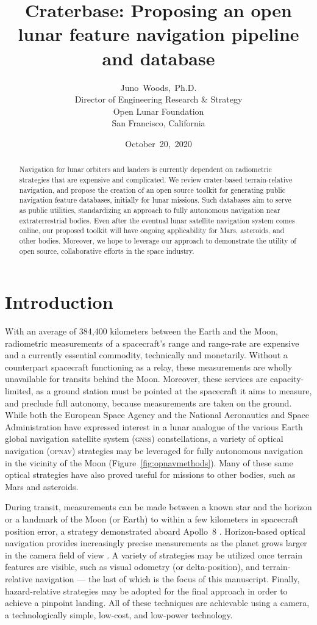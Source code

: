 \documentclass[12pt]{olfmemo}
\title{Craterbase: Proposing an open lunar feature navigation pipeline and database}
\author{
        Juno~Woods,~Ph.D. \\
        Director of Engineering Research \& Strategy\\
        Open Lunar Foundation\\
        San Francisco, California
}
\date{October~20,~2020}
\begin{document}
\maketitle

\begin{abstract}
Navigation for lunar orbiters and landers is currently dependent on radiometric strategies that are expensive and complicated. We review crater-based terrain-relative navigation, and propose the creation of an open source toolkit for generating public navigation feature databases, initially for lunar missions. Such databases aim to serve as public utilities, standardizing an approach to fully autonomous navigation near extraterrestrial bodies. Even after the eventual lunar satellite navigation system comes online, our proposed toolkit will have ongoing applicability for Mars, asteroids, and other bodies. Moreover, we hope to leverage our approach to demonstrate the utility of open source, collaborative efforts in the space industry.
\end{abstract}

\section{Introduction}
With an average of 384,400 kilometers between the Earth and the Moon, radiometric measurements of a spacecraft's range and range-rate are expensive and a currently essential commodity, technically and monetarily. Without a counterpart spacecraft functioning as a relay, these measurements are wholly unavailable for transits behind the Moon. Moreover, these services are capacity-limited, as a ground station must be pointed at the spacecraft it aims to measure, and preclude full autonomy, because measurements are taken on the ground. While both the European Space Agency and the National Aeronautics and Space Administration have expressed interest in a lunar analogue of the various Earth global navigation satellite system (\textsc{gnss}) constellations, a variety of optical navigation (\textsc{opnav}) strategies may be leveraged for fully autonomous navigation in the vicinity of the Moon \citep{Christian2009} (Figure~\ref{fig:opnavmethods}). Many of these same optical strategies have also proved useful for missions to other bodies, such as Mars and asteroids.

During transit, measurements can be made between a known star and the horizon or a landmark of the Moon (or Earth) to within a few kilometers in spacecraft position error, a strategy demonstrated aboard Apollo~8 \citep{Christian2009,Hoag1976}. Horizon-based optical navigation provides increasingly precise measurements as the planet grows larger in the camera field of view \citep{Christian2016,Christian2017}. A variety of strategies may be utilized once terrain features are visible, such as visual odometry (or delta-position), and terrain-relative navigation --- the last of which is the focus of this manuscript. Finally, hazard-relative strategies may be adopted for the final approach in order to achieve a pinpoint landing. All of these techniques are achievable using a camera, a technologically simple, low-cost, and low-power technology.
\end{document}
